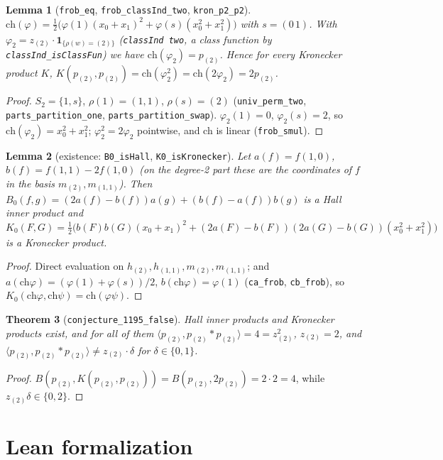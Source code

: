 \documentclass[11pt]{article}
\newtheorem{theorem}{Theorem}
\newtheorem{lemma}[theorem]{Lemma}
\theoremstyle{remark}
\newcommand{\tl}{\texttt}
\begin{document}
\begin{lemma}[\tl{frob\_eq}, \tl{frob\_classInd\_two}, \tl{kron\_p2\_p2}]
$\mathrm{ch}(\varphi)=\tfrac12\big(\varphi(1)(x_0+x_1)^2+\varphi(s)(x_0^2+x_1^2)\big)$ with
$s=(0\,1)$. With $\varphi_2=z_{(2)}\cdot\mathbf 1_{\{\rho(w)=(2)\}}$ (\tl{classInd two}, a class
function by \tl{classInd\_isClassFun}) we have $\mathrm{ch}(\varphi_2)=p_{(2)}$. Hence for every
Kronecker product $K$, $K(p_{(2)},p_{(2)})=\mathrm{ch}(\varphi_2^2)=\mathrm{ch}(2\varphi_2)
=2p_{(2)}$.
\end{lemma}
\begin{proof}
$S_2=\{1,s\}$, $\rho(1)=(1,1)$, $\rho(s)=(2)$ (\tl{univ\_perm\_two},
\tl{parts\_partition\_one}, \tl{parts\_partition\_swap}). $\varphi_2(1)=0$, $\varphi_2(s)=2$, so
$\mathrm{ch}(\varphi_2)=x_0^2+x_1^2$; $\varphi_2^2=2\varphi_2$ pointwise, and ch is linear
(\tl{frob\_smul}).
\end{proof}

\begin{lemma}[existence: \tl{B0\_isHall}, \tl{K0\_isKronecker}]
Let $a(f)=f(1,0)$, $b(f)=f(1,1)-2f(1,0)$ (on the degree-2 part these are the coordinates of $f$
in the basis $m_{(2)},m_{(1,1)}$). Then
$B_0(f,g)=(2a(f)-b(f))a(g)+(b(f)-a(f))b(g)$ is a Hall inner product and
$K_0(F,G)=\tfrac12\big(b(F)b(G)(x_0+x_1)^2+(2a(F)-b(F))(2a(G)-b(G))(x_0^2+x_1^2)\big)$ is a
Kronecker product.
\end{lemma}
\begin{proof}
Direct evaluation on $h_{(2)},h_{(1,1)},m_{(2)},m_{(1,1)}$; and
$a(\mathrm{ch}\varphi)=(\varphi(1)+\varphi(s))/2$, $b(\mathrm{ch}\varphi)=\varphi(1)$
(\tl{ca\_frob}, \tl{cb\_frob}), so $K_0(\mathrm{ch}\varphi,\mathrm{ch}\psi)=\mathrm{ch}(\varphi\psi)$.
\end{proof}

\begin{theorem}[\tl{conjecture\_1195\_false}]
Hall inner products and Kronecker products exist, and for all of them
$\langle p_{(2)},p_{(2)}*p_{(2)}\rangle=4=z_{(2)}^2$, $z_{(2)}=2$, and
$\langle p_{(2)},p_{(2)}*p_{(2)}\rangle\ne z_{(2)}\cdot\delta$ for $\delta\in\{0,1\}$.
\end{theorem}
\begin{proof}
$B(p_{(2)},K(p_{(2)},p_{(2)}))=B(p_{(2)},2p_{(2)})=2\cdot 2=4$, while
$z_{(2)}\delta\in\{0,2\}$.
\end{proof}

\section{Lean formalization}
\end{document}
